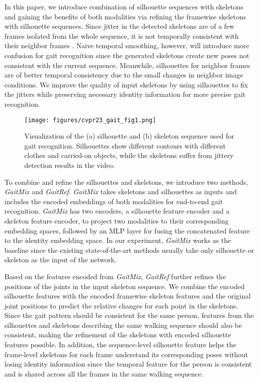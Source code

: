\documentclass[10pt,twocolumn,letterpaper]{article}
\begin{document}
In this paper, we introduce combination of silhouette sequences with skeletons and gaining the benefits of both modalities via refining the framewise skeletons with silhouette sequences. 
Since jitter in the detected skeletons are of a few frames isolated from the whole sequence, it is not temporally consistent with their neighbor frames \cite{zeng2021smoothnet}. Naive temporal smoothing, however, will introduce more confusion for  gait recognition since the generated skeletons create new poses not consistent with the current sequence. Meanwhile, silhouettes for neighbor frames are of better temporal consistency due to the small changes in neighbor image conditions.
We improve the quality of input skeletons by using silhouettes to fix the jitters while preserving necessary identity information for more precise gait recognition.


\begin{figure}[t]
    \centering
    \texttt{[image: figures/cvpr23\_gait\_fig1.png]}
    \caption{Visualization of the (a) silhouette and (b) skeleton sequence used for gait recognition. Silhouettes show different contours with different clothes and carried-on objects, while the skeletons suffer from jittery detection results in the video.}
    \label{fig:example}
\end{figure}



To combine and refine the silhouettes and skeletons, we introduce two methods, \textit{GaitMix} and \textit{GaitRef}. \textit{GaitMix} takes  skeletons and silhouettes as inputs and includes the encoded embeddings of both modalities for end-to-end gait recognition.
\textit{GaitMix} has two encoders, a silhouette feature encoder and a skeleton feature encoder, to project two modalities to their corresponding embedding spaces, followed by an MLP layer for fusing the concatenated feature to the identity embedding space. In our experiment, \textit{GaitMix} works as the baseline since the existing state-of-the-art methods usually take only silhouette \cite{chao2019gaitset,fan2020gaitpart,lin2021gaitgl,hou2020gln} or skeleton \cite{liao2020model,teepe2021gaitgraph,teepe2022towards} as the input of the network. 


Based on the features encoded from \textit{GaitMix}, \textit{GaitRef} further refines the positions of the joints in the input skeleton sequence.
We combine the encoded silhouette features with the encoded framewise skeleton features and the original joint positions to predict the relative changes for each point in the skeletons. 
Since the gait pattern should be consistent for the same person, features from the silhouettes and skeletons describing the same walking sequence should also be consistent, making the refinement of the skeletons with encoded silhouette features possible.
In addition, the sequence-level silhouette feature helps the frame-level skeletons for each frame understand its corresponding poses without losing identity information since the temporal feature for the person is consistent and is shared across all the frames in the same walking sequence. 
\end{document}
